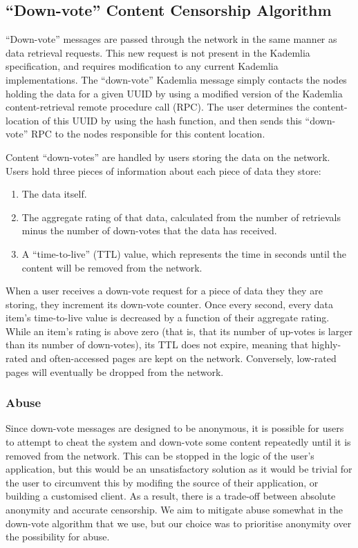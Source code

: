 \subsection{``Down-vote'' Content Censorship Algorithm}

``Down-vote'' messages are passed through the network in the same manner as data retrieval requests. This new request is
not present in the Kademlia specification, and requires modification to any current Kademlia implementations.
The ``down-vote'' Kademlia message simply contacts the nodes holding the data for a given UUID by
using a modified version of the Kademlia content-retrieval remote procedure call (RPC). The user determines the
content-location of this UUID by using the hash function, and then sends this ``down-vote'' RPC to the nodes
responsible for this content location.

Content ``down-votes'' are handled by users storing the data on the network. Users hold three pieces of information about each piece of data they store:
\begin{enumerate}
    \item The data itself.
    \item The aggregate rating of that data, calculated from the number of retrievals minus the number of
    down-votes that the data has received.
    \item A ``time-to-live'' (TTL) value, which represents the time in seconds until the content will be removed from the network.
\end{enumerate}

When a user receives a down-vote request for a piece of data they they are storing, they increment its down-vote counter.
Once every second, every data item's time-to-live value is decreased by a function of their aggregate rating.
While an item's rating is above zero (that is, that its number of up-votes is larger than its number of down-votes),
its TTL does not expire, meaning that highly-rated and often-accessed pages are kept on the network.
Conversely, low-rated pages will eventually be dropped from the network.

\subsubsection{Abuse}

Since down-vote messages are designed to be anonymous, it is possible for users to attempt to cheat the system and
down-vote some content repeatedly until it is removed from the network. This can be stopped in the logic of the
user's application, but this would be an unsatisfactory solution as it would be trivial for the user to circumvent this by
modifing the source of their application, or building a customised client. As a result, there is a trade-off between absolute
anonymity and accurate censorship. We aim to mitigate abuse somewhat in the down-vote algorithm that we use, but our choice was 
to prioritise anonymity over the possibility for abuse.

